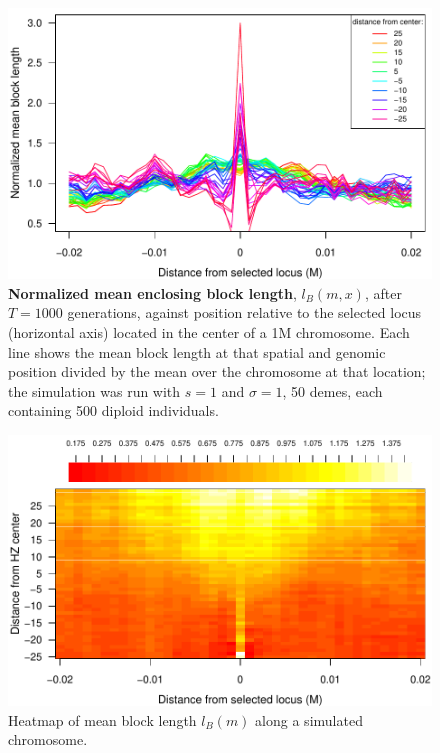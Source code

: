 \begin{figure}
\includegraphics{figs/blocksAlongChromAncBConditioning.pdf}
\caption{
    \textbf{Normalized mean enclosing block length}, $l_B(m,x)$, after $T=1000$ generations,
    against position relative to the selected locus (horizontal axis)
    located in the center of a 1M chromosome.
    Each line shows the mean block length at that spatial and genomic position
    divided by the mean over the chromosome at that location;
    the simulation was run with $s=1$ and $\sigma=1$,
    50 demes, each containing 500 diploid individuals.
}\label{Fig:blockLengths}
\end{figure}


\begin{figure}
\includegraphics{figs/blocksAlongChromHeatmapAncBConditioning.pdf}
\caption{Heatmap of mean block length $l_B(m)$ along a simulated chromosome. }\label{Supp:blockLengthHeatmap}
\end{figure}




